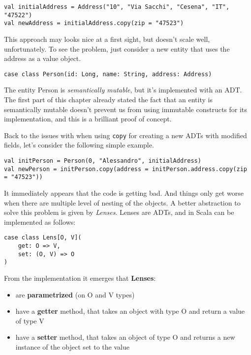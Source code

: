 \begin{verbatim}
val initialAddress = Address("10", "Via Sacchi", "Cesena", "IT", "47522")
val newAddress = initialAddress.copy(zip = "47523")
\end{verbatim}

This approach may looks nice at a first sight, but doesn't scale well,
unfortunately. To see the problem, just consider a new entity that uses
the address as a value object.

\begin{verbatim}
case class Person(id: Long, name: String, address: Address)
\end{verbatim}

The entity Person is \emph{semantically mutable}, but it's implemented
with an ADT. The first part of this chapter already stated the fact that
an entity is semantically mutable doesn't prevent us from using
immutable constructs for its implementation, and this is a brilliant
proof of concept.

Back to the issues with when using \texttt{copy} for creating a new ADTs
with modified fields, let's consider the following simple example.

\begin{verbatim}
val initPerson = Person(0, "Alessandro", initialAddress)
val newPerson = initPerson.copy(address = initPerson.address.copy(zip = "47523"))
\end{verbatim}

It immediately appears that the code is getting bad. And things only get
worse when there are multiple level of nesting of the objects. A better
abstraction to solve this problem is given by \emph{Lenses}. Lenses are
ADTs, and in Scala can be implemented as follows:

\begin{verbatim}
case class Lens[O, V](
    get: O => V,
    set: (O, V) => O
)
\end{verbatim}

From the implementation it emerges that \textbf{Lenses}:

\begin{itemize}
\itemsep1pt\parskip0pt
\item
  are \textbf{parametrized} (on O and V types)
\item
  have a \textbf{getter} method, that takes an object with type O and
  return a value of type V
\item
  have a \textbf{setter} method, that takes an object of type O and
  returns a new instance of the object set to the value
\end{itemize}

